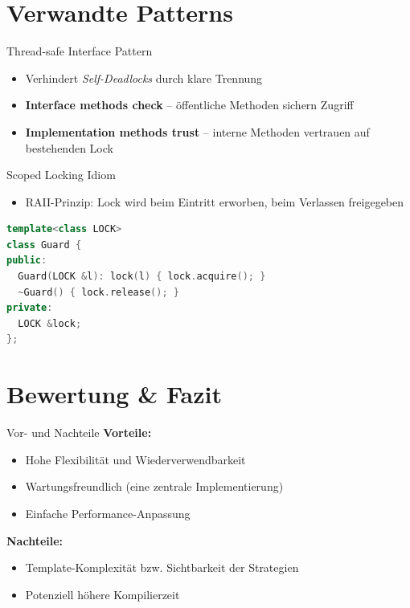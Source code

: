 \documentclass[aspectratio=169,10pt]{beamer}
\begin{document}
\section{Verwandte Patterns}
\begin{frame}{Thread-safe Interface Pattern}
  \begin{itemize}
    \item Verhindert \textit{Self-Deadlocks} durch klare Trennung
    \item \textbf{Interface methods check} -- \"offentliche Methoden sichern Zugriff
    \item \textbf{Implementation methods trust} -- interne Methoden vertrauen auf bestehenden Lock
  \end{itemize}
\end{frame}

\begin{frame}[fragile]{Scoped Locking Idiom}
  \begin{itemize}
    \item RAII-Prinzip: Lock wird beim Eintritt erworben, beim Verlassen freigegeben
  \end{itemize}
  \vspace{1em}
  \begin{lstlisting}[language=C++]
template<class LOCK>
class Guard {
public:
  Guard(LOCK &l): lock(l) { lock.acquire(); }
  ~Guard() { lock.release(); }
private:
  LOCK &lock;
};
  \end{lstlisting}
\end{frame}

\section{Bewertung \& Fazit}
\begin{frame}{Vor- und Nachteile}
  \textbf{Vorteile:}
  \begin{itemize}
    \item Hohe Flexibilit\"at und Wiederverwendbarkeit
    \item Wartungsfreundlich (eine zentrale Implementierung)
    \item Einfache Performance-Anpassung
  \end{itemize}
  \vspace{1em}
  \textbf{Nachteile:}
  \begin{itemize}
    \item Template-Komplexit\"at bzw. Sichtbarkeit der Strategien
    \item Potenziell h\"ohere Kompilierzeit
  \end{itemize}
\end{frame}
\end{document}
